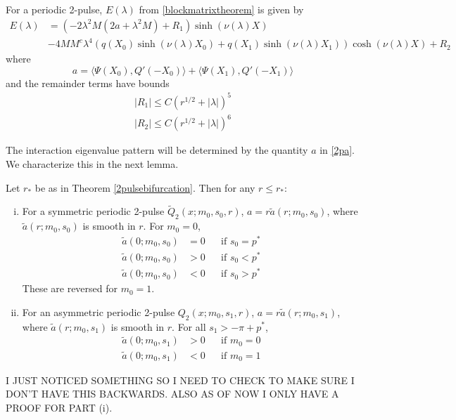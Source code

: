 \documentclass[thesis.tex]{subfiles}
\begin{document}
\begin{corollary}\label{2blockmatrix}
For a periodic 2-pulse, $E(\lambda)$ from \cref{blockmatrixtheorem} is given by
\begin{equation}\label{2detBeq}
\begin{aligned}
E(\lambda) &= \left(-2 \lambda^2 M (2a + \lambda^2 M) + R_1 \right) \sinh(\nu(\lambda)X) \\
&-4 M M^c \lambda^4 ( q(X_0) \sinh(\nu(\lambda)X_0) + q(X_1) \sinh(\nu(\lambda)X_1) ) \cosh(\nu(\lambda)X)  + R_2
\end{aligned}
\end{equation}
where
\begin{equation}\label{2pa}
a = \langle \Psi(X_0), Q'(-X_0) \rangle + \langle \Psi(X_1), Q'(-X_1) \rangle
\end{equation}
and the remainder terms have bounds
\begin{align*}
|R_1| \leq C(r^{1/2} + |\lambda|)^5 \\
|R_2| \leq C(r^{1/2} + |\lambda|)^6
\end{align*}
\end{corollary}

The interaction eigenvalue pattern will be determined by the quantity $a$ in \cref{2pa}. We characterize this in the next lemma.

\begin{lemma}\label{lemma:chara}
Let $r_*$ be as in Theorem \ref{2pulsebifurcation}. Then for any $r \leq r_*$:
\begin{enumerate}[(i)]
	\item For a symmetric periodic 2-pulse $\tilde{Q}_2(x; m_0, s_0, r)$, $a = r \tilde{a}(r; m_0, s_0)$, where $\tilde{a}(r; m_0, s_0)$ is smooth in $r$. For $m_0 = 0$,
	\begin{equation}
	\begin{aligned}
	\tilde{a}(0; m_0, s_0) &= 0 && \text{if }s_0 = p^* \\
	\tilde{a}(0; m_0, s_0) &> 0 && \text{if }s_0 < p^* \\
	\tilde{a}(0; m_0, s_0) &< 0 && \text{if }s_0 > p^*
	\end{aligned}
	\end{equation}
	These are reversed for $m_0 = 1$.
	\item For an asymmetric periodic 2-pulse $Q_2(x; m_0, s_1, r)$, $a = r \tilde{a}(r; m_0, s_1)$, where $\tilde{a}(r; m_0, s_1)$ is smooth in $r$. For all $s_1 > -\pi + p^*$,
	\begin{equation}
	\begin{aligned}
	\tilde{a}(0; m_0, s_1) &> 0 && \text{if }m_0 = 0 \\
	\tilde{a}(0; m_0, s_1) &< 0 && \text{if }m_0 = 1
	\end{aligned}
	\end{equation}
\end{enumerate}	
\end{lemma}
I JUST NOTICED SOMETHING SO I NEED TO CHECK TO MAKE SURE I DON'T HAVE THIS BACKWARDS. ALSO AS OF NOW I ONLY HAVE A PROOF FOR PART (i).
\end{document}
